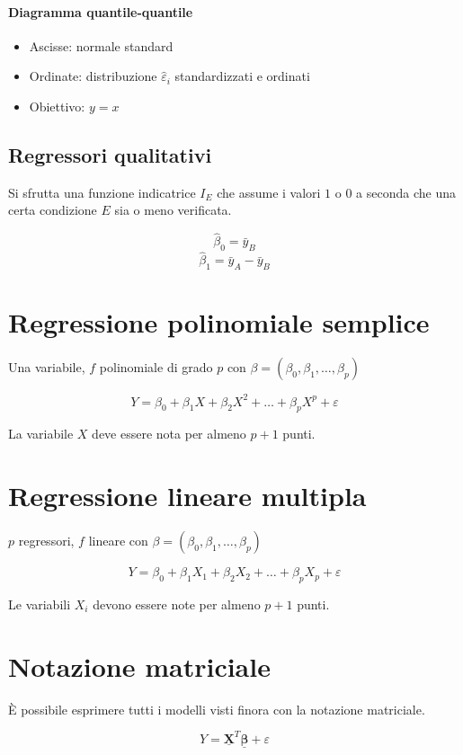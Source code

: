 \documentclass[11pt,onecolumn,a4paper,oneside]{book}
\begin{document}
\paragraph{Diagramma quantile-quantile}
\begin{itemize}
\item Ascisse: normale standard
\item Ordinate: distribuzione $\hat \varepsilon_i$ standardizzati e ordinati
\item Obiettivo: $y=x$
\end{itemize}

\subsection{Regressori qualitativi}
Si sfrutta una funzione indicatrice $I_E$ che assume i valori $1$ o $0$ a seconda che una certa condizione $E$ sia o meno verificata.

$$\hat \beta_0 = \bar y_B$$
$$\hat \beta_1 = \bar {y}_A - \bar{y}_B $$

\section{Regressione polinomiale semplice}
Una variabile, $f$ polinomiale di grado $p$ con $\beta=(\beta_0, \beta_1, \dots, \beta_p)$

$$Y = \beta_0 + \beta_1 X + \beta_2 X^2 + \dots + \beta_p X^p + \varepsilon $$

La variabile $X$ deve essere nota per almeno $p+1$ punti.

\section{Regressione lineare multipla}
$p$ regressori, $f$ lineare con $\beta=(\beta_0, \beta_1, \dots, \beta_p)$

$$Y = \beta_0 + \beta_1 X_1 + \beta_2 X_2 + \dots + \beta_p X_p + \varepsilon $$

Le variabili $X_i$ devono essere note per almeno $p+1$ punti.

\section{Notazione matriciale}
È possibile esprimere tutti i modelli visti finora con la notazione matriciale.

$$Y= \underline{\mathbf{X}}^T \underline{\mathbf{\beta}} + \varepsilon$$
\end{document}
